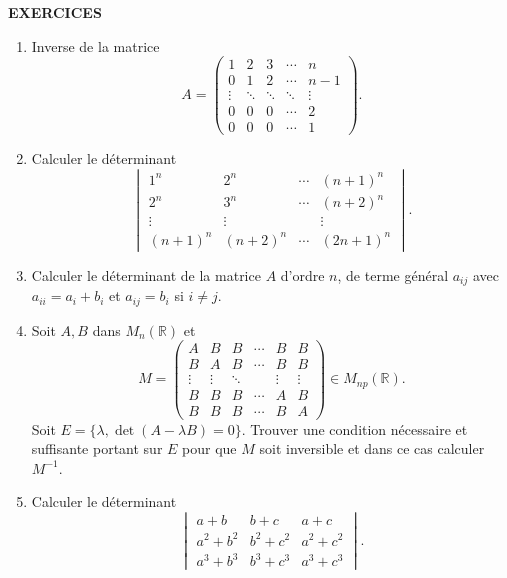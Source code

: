 
\begin{center}
{\Large\sffamily\bfseries\color{BellaLavenderDeep} EXERCICES}
\end{center}
\vspace{0.8em}

\begin{enumerate}[label=\arabic*.,leftmargin=2.2em,itemsep=1.1em]

\item Inverse de la matrice
\[
A=\begin{pmatrix}
1&2&3&\cdots&n\\
0&1&2&\cdots&n-1\\
\vdots&\ddots&\ddots&\ddots&\vdots\\
0&0&0&\cdots&2\\
0&0&0&\cdots&1
\end{pmatrix}.
\]

\item Calculer le déterminant
\[
\begin{vmatrix}
1^n&2^n&\cdots&(n+1)^n\\
2^n&3^n&\cdots&(n+2)^n\\
\vdots&\vdots&&\vdots\\
(n+1)^n&(n+2)^n&\cdots&(2n+1)^n
\end{vmatrix}.
\]

\item Calculer le déterminant de la matrice $A$ d'ordre $n$, de terme général $a_{ij}$ avec $a_{ii}=a_i+b_i$ et $a_{ij}=b_i$ si $i\ne j$.

\item Soit $A,B$ dans $M_n(\mathbb R)$ et
\[
M=\begin{pmatrix}
A&B&B&\cdots&B&B\\
B&A&B&\cdots&B&B\\
\vdots&\vdots&\ddots&&\vdots&\vdots\\
B&B&B&\cdots&A&B\\
B&B&B&\cdots&B&A
\end{pmatrix}\in M_{np}(\mathbb R).
\]
Soit $E=\{\lambda,\det(A-\lambda B)=0\}$. Trouver une condition nécessaire et suffisante portant sur $E$ pour que $M$ soit inversible et dans ce cas calculer $M^{-1}$.

\item Calculer le déterminant
\[
\begin{vmatrix}
a+b&b+c&a+c\\
a^2+b^2&b^2+c^2&a^2+c^2\\
a^3+b^3&b^3+c^3&a^3+c^3
\end{vmatrix}.
\]


\end{enumerate}
